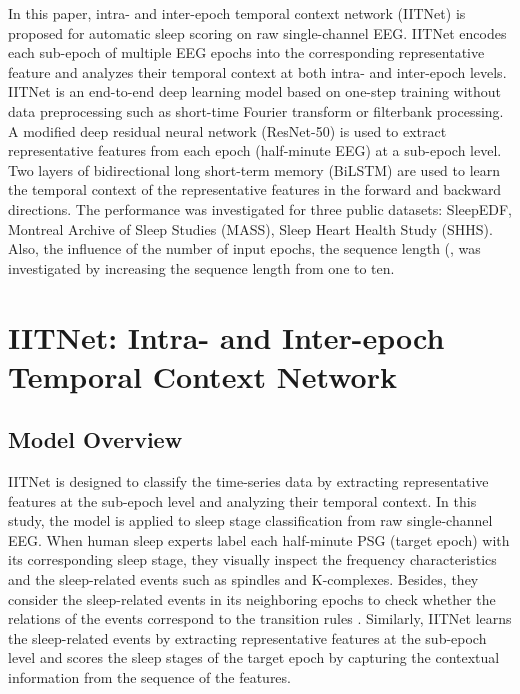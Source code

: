 \documentclass[10pt,twocolumn,twoside]{IEEEtran}
\begin{document}
    In this paper, intra- and inter-epoch temporal context network (IITNet) is proposed for automatic sleep scoring on raw single-channel EEG. IITNet encodes each sub-epoch of multiple EEG epochs into the corresponding representative feature and analyzes their temporal context at both intra- and inter-epoch levels. IITNet is an end-to-end deep learning model based on one-step training without data preprocessing such as short-time Fourier transform or filterbank processing. A modified deep residual neural network (ResNet-50) \cite{he2016deep,he2016identity} is used to extract representative features from each epoch (half-minute EEG) at a sub-epoch level. Two layers of bidirectional long short-term memory (BiLSTM) \cite{schuster1997bidirectional} are used to learn the temporal context of the representative features in the forward and backward directions. The performance was investigated for three public datasets: SleepEDF, Montreal Archive of Sleep Studies (MASS), Sleep Heart Health Study (SHHS). Also, the influence of the number of input epochs, the sequence length (, was investigated by increasing the sequence length from one to ten.



\section{IITNet: Intra- and Inter-epoch Temporal Context Network}
\label{sec:modelArch}
	
\subsection{Model Overview}


    IITNet is designed to classify the time-series data by extracting representative features at the sub-epoch level and analyzing their temporal context. In this study, the model is applied to sleep stage classification from raw single-channel EEG. When human sleep experts label each half-minute PSG (target epoch) with its corresponding sleep stage, they visually inspect the frequency characteristics and the sleep-related events such as spindles and K-complexes. Besides, they consider the sleep-related events in its neighboring epochs to check whether the relations of the events correspond to the transition rules \cite{tsinalis2016automatic}. Similarly, IITNet learns the sleep-related events by extracting representative features at the sub-epoch level and scores the sleep stages of the target epoch by capturing the contextual information from the sequence of the features.
        
\end{document}
